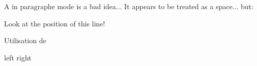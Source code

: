 \documentclass{basic}
\begin{document}

     \vspace*{1cm}

     \hspace{2cm}

     \vspace{1cm}

     A  in paragraphe mode \vspace{6cm} is a bad idea... It appears to be treated as a space... but:

     Look at the position of this line!

     Utilisation de 


     left \hfill right
\end{document}
